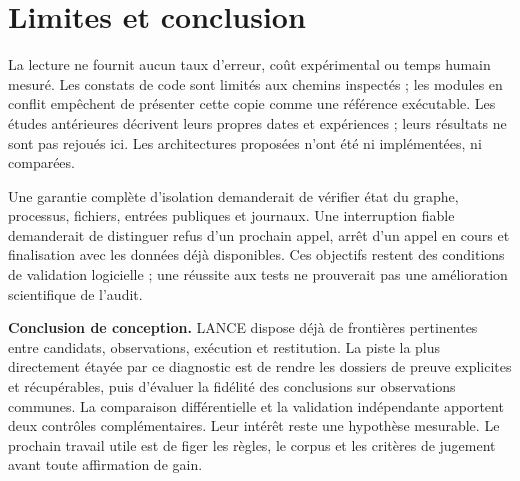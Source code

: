 \documentclass[11pt,a4paper]{article}
\begin{document}
\section{Limites et conclusion}
La lecture ne fournit aucun taux d'erreur, coût expérimental ou temps humain
mesuré. Les constats de code sont limités aux chemins inspectés ; les modules
en conflit empêchent de présenter cette copie comme une référence exécutable.
Les études antérieures décrivent leurs propres dates et expériences ; leurs
résultats ne sont pas rejoués ici. Les architectures proposées n'ont été ni
implémentées, ni comparées.

Une garantie complète d'isolation demanderait de vérifier état du graphe,
processus, fichiers, entrées publiques et journaux. Une interruption fiable
demanderait de distinguer refus d'un prochain appel, arrêt d'un appel en cours
et finalisation avec les données déjà disponibles. Ces objectifs restent des
conditions de validation logicielle ; une réussite aux tests ne prouverait pas
une amélioration scientifique de l'audit.

\textbf{Conclusion de conception.} LANCE dispose déjà de frontières pertinentes
entre candidats, observations, exécution et restitution. La piste la plus
directement étayée par ce diagnostic est de rendre les dossiers de preuve
explicites et récupérables, puis d'évaluer la fidélité des conclusions sur
observations communes. La comparaison différentielle et la validation
indépendante apportent deux contrôles complémentaires. Leur intérêt reste une
hypothèse mesurable. Le prochain travail utile est de figer les règles, le corpus
et les critères de jugement avant toute affirmation de gain.
\end{document}
